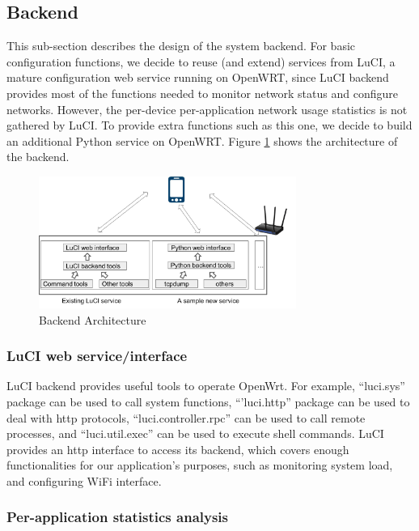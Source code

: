 \subsection{Backend}

This sub-section describes the design of the system backend. For basic configuration functions, we decide to reuse (and extend) services from LuCI, a mature configuration web service running on OpenWRT, since LuCI backend provides most of the functions needed to monitor network status and configure networks. However, the per-device per-application network usage statistics is not gathered by LuCI. To provide extra functions such as this one, we decide to build an additional Python service on OpenWRT. Figure \ref{backend-architecture} shows the architecture of the backend.

\begin{figure}
	\centering
	\includegraphics[width=0.75\textwidth]{backend-architecture.png}
	\caption{Backend Architecture}
	\label{backend-architecture}
\end{figure}

\subsubsection{LuCI web service/interface}

LuCI backend provides useful tools to operate OpenWrt. For example, ``luci.sys'' package can be used to call system functions, ``'luci.http'' package can be used to deal with http protocols, ``luci.controller.rpc'' can be used to call remote processes, and ``luci.util.exec'' can be used to execute shell commands. LuCI provides an http interface to access its backend, which covers enough functionalities for our application's purposes, such as monitoring system load, and configuring WiFi interface.

\subsubsection{Per-application statistics analysis}
\label{sec:app-specific-design}


